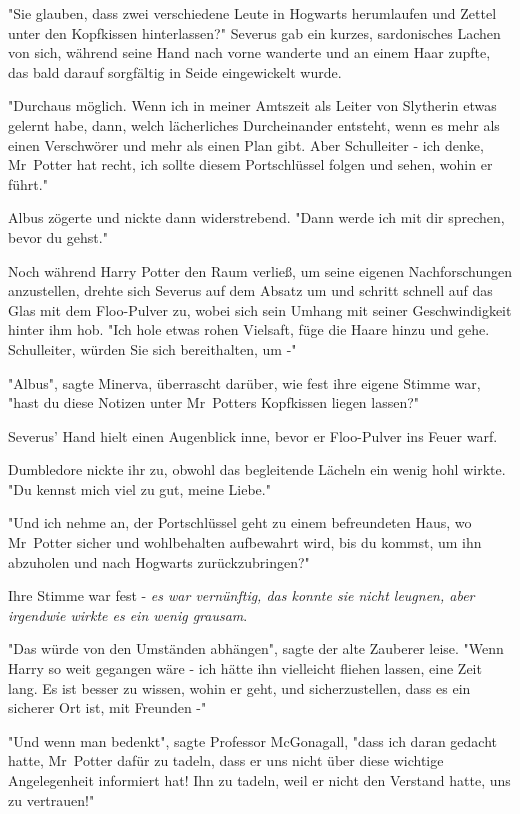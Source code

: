 {"Sie glauben, dass zwei verschiedene Leute in Hogwarts herumlaufen und Zettel unter den Kopfkissen hinterlassen?" Severus gab ein kurzes, sardonisches Lachen von sich, während seine Hand nach vorne wanderte und an einem Haar zupfte, das bald darauf sorgfältig in Seide eingewickelt wurde.

"Durchaus möglich. Wenn ich in meiner Amtszeit als Leiter von Slytherin etwas gelernt habe, dann, welch lächerliches Durcheinander entsteht, wenn es mehr als einen Verschwörer und mehr als einen Plan gibt. Aber Schulleiter - ich denke, Mr~Potter hat recht, ich sollte diesem Portschlüssel folgen und sehen, wohin er führt."

Albus zögerte und nickte dann widerstrebend. "Dann werde ich mit dir sprechen, bevor du gehst."

Noch während Harry Potter den Raum verließ, um seine eigenen Nachforschungen anzustellen, drehte sich Severus auf dem Absatz um und schritt schnell auf das Glas mit dem Floo-Pulver zu, wobei sich sein Umhang mit seiner Geschwindigkeit hinter ihm hob. "Ich hole etwas rohen Vielsaft, füge die Haare hinzu und gehe. Schulleiter, würden Sie sich bereithalten, um -"

"Albus", sagte Minerva, überrascht darüber, wie fest ihre eigene Stimme war, "hast du diese Notizen unter Mr~Potters Kopfkissen liegen lassen?"

Severus' Hand hielt einen Augenblick inne, bevor er Floo-Pulver ins Feuer warf.

Dumbledore nickte ihr zu, obwohl das begleitende Lächeln ein wenig hohl wirkte. "Du kennst mich viel zu gut, meine Liebe."

"Und ich nehme an, der Portschlüssel geht zu einem befreundeten Haus, wo Mr~Potter sicher und wohlbehalten aufbewahrt wird, bis du kommst, um ihn abzuholen und nach Hogwarts zurückzubringen?"

Ihre Stimme war fest - \emph{es war vernünftig, das konnte sie nicht leugnen, aber irgendwie wirkte es ein wenig grausam}.

"Das würde von den Umständen abhängen", sagte der alte Zauberer leise. "Wenn Harry so weit gegangen wäre - ich hätte ihn vielleicht fliehen lassen, eine Zeit lang. Es ist besser zu wissen, wohin er geht, und sicherzustellen, dass es ein sicherer Ort ist, mit Freunden -"

"Und wenn man bedenkt", sagte Professor McGonagall, "dass ich daran gedacht hatte, Mr~Potter dafür zu tadeln, dass er uns nicht über diese wichtige Angelegenheit informiert hat! Ihn zu tadeln, weil er nicht den Verstand hatte, uns zu vertrauen!"

}
